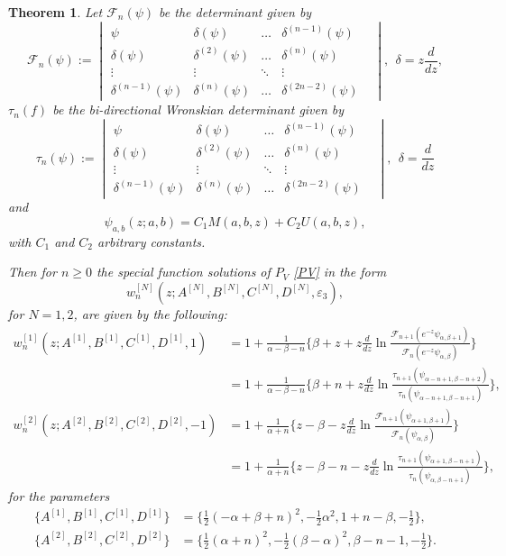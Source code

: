 \documentclass[12pt]{article}
\def\F{\mathcal{F}}
\newtheorem{mydef}{Theorem}[section]
\numberwithin{figure}{section}
\numberwithin{equation}{section}
\numberwithin{table}{section}
\begin{document}
\begin{mydef}
Let $\F_n(\psi)$ be the determinant given by
\[
\F_n(\psi):=
\!\begin{vmatrix}
\psi & \delta(\psi) &\hdots& \delta^{(n-1)}(\psi) \\
\delta(\psi) & \delta^{(2)}(\psi) &\hdots& \delta^{(n)}(\psi)  \\
\vdots &\vdots & \ddots & \vdots & \\
\delta^{(n-1)}(\psi) & \delta^{(n)}(\psi) &\hdots& \delta^{(2n-2)}(\psi)
\end{vmatrix},~~\delta=z\frac{d}{dz},
\]
$\tau_n(f)$ be the bi-directional Wronskian determinant given by
\[
\tau_n(\psi):=
\!\begin{vmatrix}
\psi & \delta(\psi) &\hdots& \delta^{(n-1)}(\psi) \\
\delta(\psi) & \delta^{(2)}(\psi) &\hdots& \delta^{(n)}(\psi)  \\
\vdots &\vdots & \ddots & \vdots & \\
\delta^{(n-1)}(\psi) & \delta^{(n)}(\psi) &\hdots& \delta^{(2n-2)}(\psi)
\end{vmatrix},~~\delta=\frac{d}{dz}
\]
and
\begin{equation}
\psi_{a,b}(z;a,b)=C_1M(a,b,z)+C_2U(a,b,z),\label{psi}
\end{equation}
with $C_1$ and $C_2$ arbitrary constants.

Then for $n\geq0$ the special function solutions of $P_{V}$ \eqref{PV} in the form
$$w_n^{[N]}(z;A^{[N]},B^{[N]},C^{[N]},D^{[N]},\varepsilon_3),$$ for $N=1,2$, are given by the following:
\begin{align*}\nonumber
w_n^{[1]}(z;A^{[1]},B^{[1]},C^{[1]},D^{[1]},1)&=1+\frac{1}{\alpha-\beta-n}\bigg\{\beta+z+z\frac{d}{dz}\ln\frac{\mathcal{F}_{n+1}
(e^{-z}\psi_{\alpha,\beta+1})}{\mathcal{F}_{n}(e^{-z}\psi_{\alpha,\beta})}\bigg\}\\\nonumber
&=1+\frac{1}{\alpha-\beta-n}\bigg\{\beta+n+z\frac{d}{dz}\ln\frac{\tau_{n+1}(\psi_{\alpha-n+1,\beta-n+2})}{\tau_{n}(\psi_
{\alpha-n+1,\beta-n+1})}\bigg\},\\
w_n^{[2]}(z;A^{[2]},B^{[2]},C^{[2]},D^{[2]},-1)&=1+\frac{1}{\alpha+
n}\bigg\{z-\beta-z\frac{d}{dz}\ln\frac{\mathcal{F}_{n+1}(\psi_{\alpha+1,\beta+1})}{\mathcal{F}_{n}(\psi_{\alpha,\beta})}\bigg\}\\\nonumber
&=1+\frac{1}{\alpha+n}\bigg\{z-\beta-n-z\frac{d}{dz}\ln\frac{\tau_{n+1}(\psi_{\alpha+1,\beta-n+1})}{\tau_{n}
(\psi_{\alpha,\beta-n+1})}\bigg\},
\end{align*}
for the parameters
\begin{subequations}
\begin{align}
\{A^{[1]},B^{[1]},C^{[1]},D^{[1]}\}&=\{\tfrac{1}{2}(-\alpha+\beta+n)^2,-\tfrac{1}{2}\alpha^2,1+n-\beta,-\tfrac{1}{2}\},\label{w1para} \\
\{A^{[2]},B^{[2]},C^{[2]},D^{[2]}\}&=\{\tfrac{1}{2}(\alpha+n)^2,-\tfrac{1}{2}(\beta-\alpha)^2,\beta-n-1,-\tfrac{1}{2}\}.\label{w2para}
\end{align}
\end{subequations}
\end{mydef}
\end{document}
